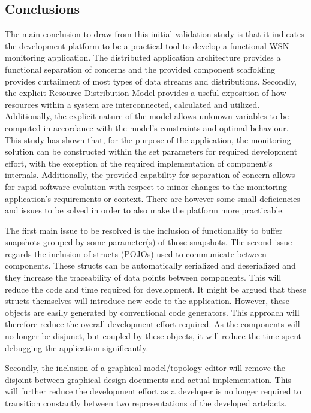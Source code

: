 \subsection{Conclusions}
The main conclusion to draw from this initial validation study is that it indicates the development platform to be a practical tool to develop a functional WSN monitoring application. The distributed application architecture provides a functional separation of concerns and the provided component scaffolding provides curtailment of most types of data streams and distributions. Secondly, the explicit Resource Distribution Model provides a useful exposition of how resources within a system are interconnected, calculated and utilized. Additionally, the explicit nature of the model allows unknown variables to be computed in accordance with the model's constraints and optimal behaviour. This study has shown that, for the purpose of the \nedap\idsystems\sensit application, the monitoring solution can be constructed within the set parameters for required development effort, with the exception of the required implementation of component's internals. Additionally, the provided capability for separation of concern allows for rapid software evolution with respect to minor changes to the monitoring application's requirements or context. There are however some small deficiencies and issues to be solved in order to also make the platform more practicable.

The first main issue to be resolved is the inclusion of functionality to buffer snapshots grouped by some parameter(s) of those snapshots. The second issue regards the inclusion of structs (POJOs) used to communicate between components. These structs can be automatically serialized and deserialized and they increase the traceability of data points between components. This will reduce the code and time required for development. It might be argued that these structs themselves will introduce new code to the application. However, these objects are easily generated by conventional code generators. This approach will therefore reduce the overall development effort required. As the components will no longer be disjunct, but coupled by these objects, it will reduce the time spent debugging the application significantly.

Secondly, the inclusion of a graphical model/topology editor will remove the disjoint between graphical design documents and actual implementation. This will further reduce the development effort as a developer is no longer required to transition constantly between two representations of the developed artefacts.


